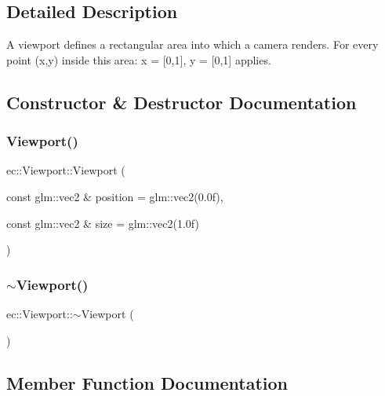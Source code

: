 \subsection{Detailed Description}
A viewport defines a rectangular area into which a camera renders. For every point (x,y) inside this area\+: x = \mbox{[}0,1\mbox{]}, y = \mbox{[}0,1\mbox{]} applies. 

\subsection{Constructor \& Destructor Documentation}
\mbox{\label{classec_1_1_viewport_a287d09d9303d9fbbea3c915f832d2ab8}} 
\subsubsection{\texorpdfstring{Viewport()}{Viewport()}}
{\footnotesize\ttfamily ec\+::\+Viewport\+::\+Viewport (\begin{DoxyParamCaption}\item[{const glm\+::vec2 \&}]{position = {\ttfamily glm\+:\+:vec2(0.0f)},  }\item[{const glm\+::vec2 \&}]{size = {\ttfamily glm\+:\+:vec2(1.0f)} }\end{DoxyParamCaption})\hspace{0.3cm}{\ttfamily [explicit]}}

\mbox{\label{classec_1_1_viewport_a65341c63372c6158a0a2932fa1f2c66b}} 
\subsubsection{\texorpdfstring{$\sim$\+Viewport()}{~Viewport()}}
{\footnotesize\ttfamily ec\+::\+Viewport\+::$\sim$\+Viewport (\begin{DoxyParamCaption}{ }\end{DoxyParamCaption})\hspace{0.3cm}{\ttfamily [default]}}



\subsection{Member Function Documentation}
\mbox{\label{classec_1_1_viewport_a49643e5dae2f5813280b5adf34c28e59}} 
